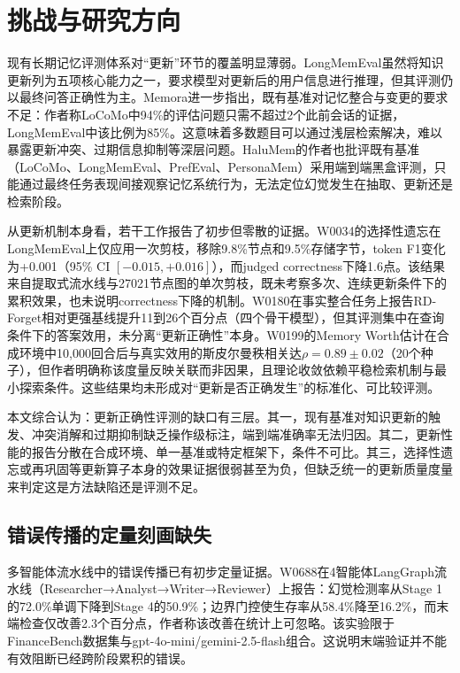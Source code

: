 \section{挑战与研究方向}

现有长期记忆评测体系对“更新”环节的覆盖明显薄弱。LongMemEval虽然将知识更新列为五项核心能力之一，要求模型对更新后的用户信息进行推理，但其评测仍以最终问答正确性为主\cite{W0006}。Memora进一步指出，既有基准对记忆整合与变更的要求不足：作者称LoCoMo中94\%的评估问题只需不超过2个此前会话的证据，LongMemEval中该比例为85\%\cite{W0171}。这意味着多数题目可以通过浅层检索解决，难以暴露更新冲突、过期信息抑制等深层问题。HaluMem的作者也批评既有基准（LoCoMo、LongMemEval、PrefEval、PersonaMem）采用端到端黑盒评测，只能通过最终任务表现间接观察记忆系统行为，无法定位幻觉发生在抽取、更新还是检索阶段\cite{W0261}。

从更新机制本身看，若干工作报告了初步但零散的证据。W0034的选择性遗忘在LongMemEval上仅应用一次剪枝，移除9.8\%节点和9.5\%存储字节，token F1变化为+0.001（95\% CI $[-0.015,+0.016]$），而judged correctness下降1.6点\cite{W0034}。该结果来自提取式流水线与27021节点图的单次剪枝，既未考察多次、连续更新条件下的累积效果，也未说明correctness下降的机制。W0180在事实整合任务上报告RD-Forget相对更强基线提升11到26个百分点（四个骨干模型），但其评测集中在查询条件下的答案效用，未分离“更新正确性”本身\cite{W0180}。W0199的Memory Worth估计在合成环境中10,000回合后与真实效用的斯皮尔曼秩相关达$\rho=0.89\pm0.02$（20个种子），但作者明确称该度量反映关联而非因果，且理论收敛依赖平稳检索机制与最小探索条件\cite{W0199}。这些结果均未形成对“更新是否正确发生”的标准化、可比较评测。

本文综合认为：更新正确性评测的缺口有三层。其一，现有基准对知识更新的触发、冲突消解和过期抑制缺乏操作级标注，端到端准确率无法归因。其二，更新性能的报告分散在合成环境、单一基准或特定框架下，条件不可比。其三，选择性遗忘或再巩固等更新算子本身的效果证据很弱甚至为负，但缺乏统一的更新质量度量来判定这是方法缺陷还是评测不足。

\subsection{错误传播的定量刻画缺失}

多智能体流水线中的错误传播已有初步定量证据。W0688在4智能体LangGraph流水线（Researcher→Analyst→Writer→Reviewer）上报告：幻觉检测率从Stage 1的72.0\%单调下降到Stage 4的50.9\%；边界门控使生存率从58.4\%降至16.2\%，而末端检查仅改善2.3个百分点，作者称该改善在统计上可忽略\cite{W0688}。该实验限于FinanceBench数据集与gpt-4o-mini/gemini-2.5-flash组合。这说明末端验证并不能有效阻断已经跨阶段累积的错误。

